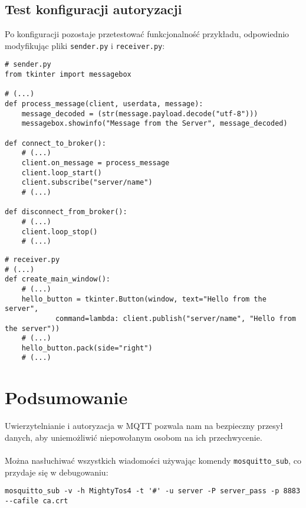 \documentclass[10pt,a4paper]{article}
\begin{document}
\subsection{Test konfiguracji autoryzacji}
Po konfiguracji pozostaje przetestować funkcjonalność przykładu, odpowiednio modyfikując pliki \texttt{sender.py} i \texttt{receiver.py}:

\begin{verbatim}
# sender.py
from tkinter import messagebox

# (...)
def process_message(client, userdata, message):
    message_decoded = (str(message.payload.decode("utf-8")))
    messagebox.showinfo("Message from the Server", message_decoded)

def connect_to_broker():
    # (...)
    client.on_message = process_message
    client.loop_start()
    client.subscribe("server/name")
    # (...)

def disconnect_from_broker():
    # (...)
    client.loop_stop()
    # (...)
\end{verbatim}
\begin{verbatim}
# receiver.py
# (...)
def create_main_window():
    # (...)
    hello_button = tkinter.Button(window, text="Hello from the server",
            command=lambda: client.publish("server/name", "Hello from the server"))
    # (...)
    hello_button.pack(side="right")
    # (...)
\end{verbatim}

\section{Podsumowanie}
Uwierzytelnianie i autoryzacja w MQTT pozwala nam na bezpieczny przesył danych, aby uniemożliwić niepowołanym osobom na ich przechwycenie.
\\\\
Można nasłuchiwać wszystkich wiadomości używając komendy \texttt{mosquitto\_sub}, co przydaje się w debugowaniu:
\begin{verbatim}
mosquitto_sub -v -h MightyTos4 -t '#' -u server -P server_pass -p 8883 --cafile ca.crt
\end{verbatim}
\end{document}
